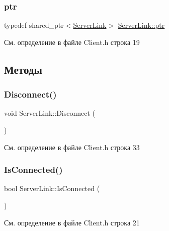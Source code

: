 \subsubsection{\texorpdfstring{ptr}{ptr}}
{\footnotesize\ttfamily typedef shared\+\_\+ptr$<$\mbox{\hyperlink{class_server_link}{Server\+Link}}$>$ \mbox{\hyperlink{class_server_link_afb05b9f4060b17ac50d2fb3b874ce236}{Server\+Link\+::ptr}}}



См. определение в файле Client.\+h строка 19



\subsection{Методы}
\mbox{\label{class_server_link_afa570df0c508889210e9ac2ff5983306}} 
\subsubsection{\texorpdfstring{Disconnect()}{Disconnect()}}
{\footnotesize\ttfamily void Server\+Link\+::\+Disconnect (\begin{DoxyParamCaption}{ }\end{DoxyParamCaption})\hspace{0.3cm}{\ttfamily [inline]}}



См. определение в файле Client.\+h строка 33

\mbox{\label{class_server_link_a2f551c4fffbedab55adab3d528df0f0c}} 
\subsubsection{\texorpdfstring{IsConnected()}{IsConnected()}}
{\footnotesize\ttfamily bool Server\+Link\+::\+Is\+Connected (\begin{DoxyParamCaption}{ }\end{DoxyParamCaption})\hspace{0.3cm}{\ttfamily [inline]}}



См. определение в файле Client.\+h строка 21

\mbox{\label{class_server_link_a9cdc703cdda0ff80c49434d483654d7e}} 
